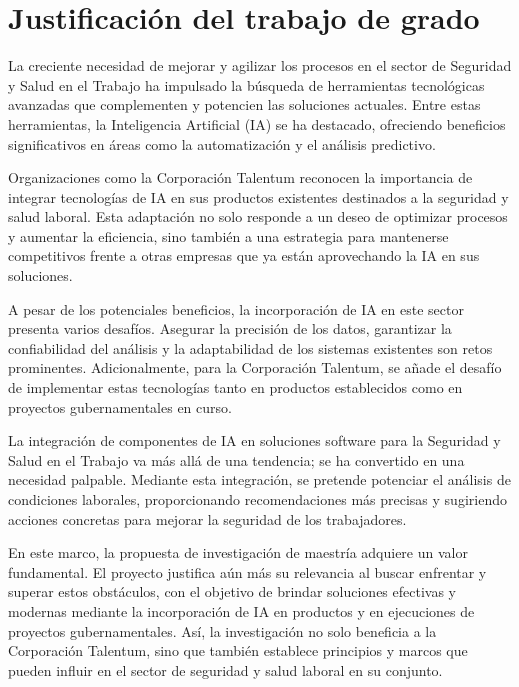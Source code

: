 \section{Justificación del trabajo de grado}
\label{sec:justificacion}
La creciente necesidad de mejorar y agilizar los procesos en el sector de Seguridad y Salud en el Trabajo ha impulsado la búsqueda de herramientas tecnológicas avanzadas que complementen y potencien las soluciones actuales. Entre estas herramientas, la Inteligencia Artificial (IA) se ha destacado, ofreciendo beneficios significativos en áreas como la automatización y el análisis predictivo.

Organizaciones como la Corporación Talentum reconocen la importancia de integrar tecnologías de IA en sus productos existentes destinados a la seguridad y salud laboral. Esta adaptación no solo responde a un deseo de optimizar procesos y aumentar la eficiencia, sino también a una estrategia para mantenerse competitivos frente a otras empresas que ya están aprovechando la IA en sus soluciones.

A pesar de los potenciales beneficios, la incorporación de IA en este sector presenta varios desafíos. Asegurar la precisión de los datos, garantizar la confiabilidad del análisis y la adaptabilidad de los sistemas existentes son retos prominentes. Adicionalmente, para la Corporación Talentum, se añade el desafío de implementar estas tecnologías tanto en productos establecidos como en proyectos gubernamentales en curso.

La integración de componentes de IA en soluciones software para la Seguridad y Salud en el Trabajo va más allá de una tendencia; se ha convertido en una necesidad palpable. Mediante esta integración, se pretende potenciar el análisis de condiciones laborales, proporcionando recomendaciones más precisas y sugiriendo acciones concretas para mejorar la seguridad de los trabajadores.

En este marco, la propuesta de investigación de maestría adquiere un valor fundamental. El proyecto justifica aún más su relevancia al buscar enfrentar y superar estos obstáculos, con el objetivo de brindar soluciones efectivas y modernas mediante la incorporación de IA en productos y en ejecuciones de proyectos gubernamentales. Así, la investigación no solo beneficia a la Corporación Talentum, sino que también establece principios y marcos que pueden influir en el sector de seguridad y salud laboral en su conjunto.
